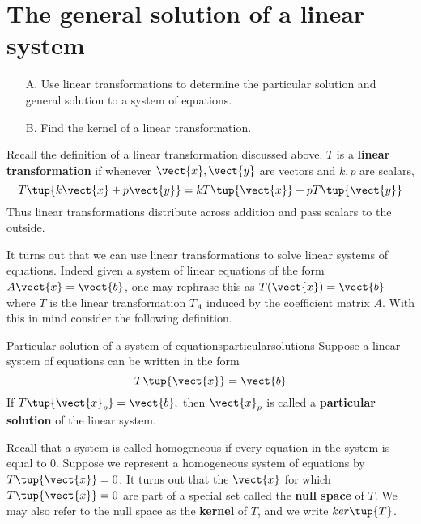 \section{The general solution of a linear system}

\begin{outcome}
\begin{enumerate}
\item[A.]  Use linear transformations to determine the particular solution and general solution to a system of equations.

\item[B.]  Find the kernel of a linear transformation. 
\end{enumerate}
\end{outcome}

Recall the definition of a linear transformation discussed above. 
$T$ is a \textbf{linear transformation} if whenever $\vect{x}, \vect{y}$ are
vectors and $k,p$ are scalars,
\begin{equation*}
T\tup{k\vect{x}+p\vect{y}} =k T \tup{\vect{x} } +p T\tup{\vect{y} }
\end{equation*}
Thus linear transformations distribute across addition and pass scalars to
the outside.

It turns out that we can use linear transformations to solve linear
systems of equations. Indeed given a system of linear equations of the
form $A\vect{x}=\vect{b}$, one may rephrase this as $T(\vect{x})=\vect{b}$ where $T$ is the linear
transformation $T_A$ induced by the coefficient matrix $A$. With this in mind consider the following definition. 

\begin{definition}{Particular solution of a system of equations}{particularsolutions}
Suppose a linear system of equations can be written in the form
\begin{equation*}
T\tup{\vect{x}}=\vect{b}
\end{equation*}
If $T\tup{\vect{x}_{p}}=\vect{b},$ 
then $\vect{x}_{p}$ is called a \textbf{particular solution} of
the linear system.
\end{definition}

Recall that a system is called homogeneous if every equation in the system is equal to $0$. 
Suppose we represent a homogeneous system of equations by $T\tup{\vect{x}}=0$. It turns out
that the $\vect{x}$ for which $T \tup{\vect{x}} = 0$ are part of a special set called the \textbf{null space}
of $T$. We may also refer to the null space as the \textbf{kernel} of $T$, and we write $ker\tup{T}$. 

